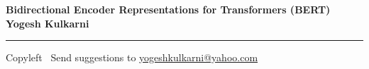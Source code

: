 
\graphicspath{{images/}}

\footnotesize


\begin{center}
\Large{\textbf{Bidirectional Encoder Representations for Transformers (BERT)\\ Yogesh Kulkarni}}  
\end{center}

\begin{multicols}{2}

\end{multicols}

\rule{\linewidth}{0.25pt}
\scriptsize
Copyleft \textcopyleft\  Send suggestions to 
\href{http://www.yogeshkulkarni.com}{yogeshkulkarni@yahoo.com}


